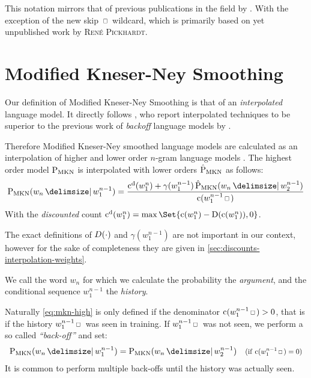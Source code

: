 This notation mirrors that of previous publications in the field by
\textcite{ChenGoodman1996,ChenGoodman1998,ChenGoodman1999,Goodman2001,Pickhardt2014}.
With the exception of the new skip $\Skp$ wildcard, which is primarily based
on yet unpublished work by \textsc{Ren{\'e} Pickhardt}.

\section{Modified Kneser-Ney Smoothing}
\label{sec:review-lm-mkn}

Our definition of Modified Kneser-Ney Smoothing is that of an
\emph{interpolated} language model.
It directly follows \textcite{ChenGoodman1999}, who report interpolated
techniques to be superior to the previous work of \emph{backoff} language
models by \textcite{KneserNey1995}.

Therefore Modified Kneser-Ney smoothed language models are calculated as an
interpolation of higher and lower order $n$-gram language models
\parencite{Pickhardt2014}.
The highest order model $\ProbMKN$ is interpolated with lower orders $\ProbMKN*$
as follows:
\begin{equation}
  \label{eq:mkn-high}
  \ProbMKN{w_n}{w_1^{n-1}} =
    \frac{\DiscountedCount(w_1^n) + \gamma(w_1^{n-1}) \ProbMKN*{w_n}{w_2^{n-1}}}
         {\Count(w_1^{n-1} \Skp)} \\
\end{equation}
With the \emph{discounted} count
${\DiscountedCount(w_1^n) = \max\Set{\Count(w_1^n) - \Discount(\Count(w_1^n)), 0}}$.

The exact definitions of $D(\cdot)$ and $\gamma(w_1^{n-1})$ are not
important in our context, however for the sake of completeness they are given
in \cref{sec:discounts-interpolation-weights}.

We call the word $w_n$ for which we calculate the probability the
\emph{argument}, and the conditional sequence $w_1^{n-1}$ the \emph{history}.

Naturally \cref{eq:mkn-high} is only defined if the denominator
${\Count(w_1^{n-1} \Skp) > 0}$, that is if the history $w_1^{n-1} \Skp$ was seen
in training.
If $w_1^{n-1} \Skp$ was not seen, we perform a so called \emph{``back-off''}
and set:
\begin{align}
  \label{eq:mkn-backoff}
  \ProbMKN{w_n}{w_1^{n-1}} = \ProbMKN{w_n}{w_2^{n-1}}
      & & \Condition{\Count(w_1^{n-1} \Skp) = 0}
\end{align}
It is common to perform multiple back-offs until the history was actually seen.

